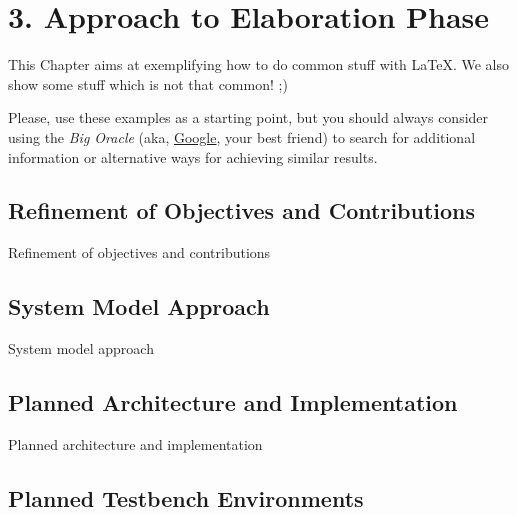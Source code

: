 \chapter{3.	Approach to Elaboration Phase}
\label{cha:approach_to_elaboration_phase}

This Chapter aims at exemplifying how to do common stuff with \LaTeX. We also show some stuff which is not that common! ;)

Please, use these examples as a starting point, but you should always consider using the \emph{Big Oracle} (aka, \href{http://www.google.com}{Google}, your best friend) to search for additional information or alternative ways for achieving similar results.

\section{Refinement of Objectives and Contributions} %
\label{sec:refinement_of_objectives_and_contributions}

Refinement of objectives and contributions



\section{System Model Approach} %
\label{sec:system_model_approach}

System model approach



\section{Planned Architecture and Implementation} %
\label{sec:planned_architecture_and_implementation}

Planned architecture and implementation



\section{Planned Testbench Environments} %
\label{sec:planned_testbench_environments}

